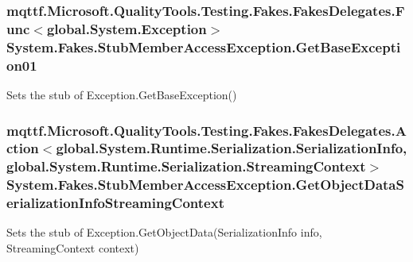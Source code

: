 \hypertarget{class_system_1_1_fakes_1_1_stub_member_access_exception_ab654b22a47329da33461ed1ef17d6950}{
\subsubsection[{Get\-Base\-Exception01}]{\setlength{\rightskip}{0pt plus 5cm}mqttf.\-Microsoft.\-Quality\-Tools.\-Testing.\-Fakes.\-Fakes\-Delegates.\-Func$<$global.\-System.\-Exception$>$ System.\-Fakes.\-Stub\-Member\-Access\-Exception.\-Get\-Base\-Exception01}}\label{class_system_1_1_fakes_1_1_stub_member_access_exception_ab654b22a47329da33461ed1ef17d6950}


Sets the stub of Exception.\-Get\-Base\-Exception()

\hypertarget{class_system_1_1_fakes_1_1_stub_member_access_exception_a2674cbcca52341f587ee5d71a340ba2b}{
\subsubsection[{Get\-Object\-Data\-Serialization\-Info\-Streaming\-Context}]{\setlength{\rightskip}{0pt plus 5cm}mqttf.\-Microsoft.\-Quality\-Tools.\-Testing.\-Fakes.\-Fakes\-Delegates.\-Action$<$global.\-System.\-Runtime.\-Serialization.\-Serialization\-Info, global.\-System.\-Runtime.\-Serialization.\-Streaming\-Context$>$ System.\-Fakes.\-Stub\-Member\-Access\-Exception.\-Get\-Object\-Data\-Serialization\-Info\-Streaming\-Context}}\label{class_system_1_1_fakes_1_1_stub_member_access_exception_a2674cbcca52341f587ee5d71a340ba2b}


Sets the stub of Exception.\-Get\-Object\-Data(\-Serialization\-Info info, Streaming\-Context context)

